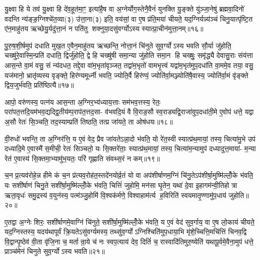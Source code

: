यु॒क्ष्वा हि ये तव॑ यु॒क्ष्वा हि दे॑व॒हूत॑मा॒ꣳ॒ इत्या॑है॒ष वा अ॒ग्नेर्योग॒स्तेनै॒वैनं॑ युनक्ति यु॒ङ्क्ते यु॑ञ्जा॒नेषु॑ ब्रह्मवा॒दिनो॑ वदन्ति न्य॑ङ्ङ॒ग्निश्चे॑त॒व्या(३) उ॑त्ता॒ना(३) इति॒ वय॑सां॒ वा ए॒ष प्र॑ति॒मया॑ चीयते॒ यद॒ग्निर्यन्न्य॑ञ्चं चिनु॒यात्पृ॑ष्टि॒त ए॑न॒माहु॑तय ऋच्छेयु॒र्यदु॑त्ता॒नं न पति॑तु शक्नुया॒दसु॑वर्ग्योऽस्य स्यात्प्रा॒चीन॑मुत्ता॒नम्॥१६॥

पु॒रु॒ष॒शी॒र्\mbox{}षमुप॑ दधाति मुख॒त ए॒वैन॒माहु॑तय ऋच्छन्ति॒ नोत्ता॒नं चि॑नुते सुव॒र्ग्योऽस्य भवति सौ॒र्या जु॑होति॒ चख्षु॑रे॒वास्मि॒न्प्रति॑ दधाति॒ द्विर्जु॑होति॒ द्वे हि चख्षु॑षी समा॒न्या जु॑होति समा॒न हि चख्षुः॒ समृ॑द्ध्यै देवासु॒राः संय॑त्ता आस॒न्ते वा॒मं वसु॒ सं न्य॑दधत॒ तद्दे॒वा वा॑म॒भृता॑वृञ्जत॒ तद्वा॑म॒भृतो॑ वामभृ॒त्त्वं यद्वा॑म॒भृत॑मुप॒दधा॑ति वा॒ममे॒व तया॒ वसु॒ यज॑मानो॒ भ्रातृ॑व्यस्य वृङ्क्ते॒ हिर॑ण्यमूर्ध्नी भवति॒ ज्योति॒र्वै हिर॑ण्यं॒ ज्योति॑र्वा॒मञ्ज्योति॑षै॒वास्य॒ ज्योति॑र्वा॒मं वृ॑ङ्क्ते द्विय॒जुर्भ॑वति॒ प्रति॑ष्ठित्यै॥१७॥

{\anuvakamend[{यु॒ञ्जा॒नेष्वग्ने प्रा॒चीन॑मुत्ता॒नं वा॑म॒भृत॒ञ्चतु॑र्विशतिश्च॥३॥}]}

आपो॒ वरु॑णस्य॒ पत्न॑य आस॒न्ता अ॒ग्निर॒भ्य॑ध्याय॒त्ताः सम॑भव॒त्तस्य॒ रेतः॒ परा॑पत॒त्तदि॒यम॑भव॒द्यद्द्वि॒तीय॑म्प॒राप॑त॒त्तद॒सा- व॑भवदि॒यं वै वि॒राड॒सौ स्व॒राड्यद्वि॒राजा॑वुप॒दधा॑ती॒मे ए॒वोप॑ धत्ते॒ यद्वा अ॒सौ रेतः॑ सि॒ञ्चति॒ तद॒स्याम्प्रति॑ तिष्ठति॒ तत्प्र जा॑यते॒ ता ओष॑धयः॥१८॥

वी॒रुधो॑ भवन्ति॒ ता अ॒ग्निर॑त्ति॒ य ए॒वं वेद॒ प्रैव जा॑यतेऽन्ना॒दो भ॑वति॒ यो रे॑त॒स्वी स्यात्प्र॑थ॒मायां॒ तस्य॒ चित्या॑मु॒भे उप॑ दध्यादि॒मे ए॒वास्मै॑ स॒मीची॒ रेतः॑ सिञ्चतो॒ यः सि॒क्तरे॑ताः॒ स्यात्प्र॑थ॒मायां॒ तस्य॒ चित्या॑म॒न्यामुप॑ दध्यादुत्त॒माया॑- म॒न्या रेत॑ ए॒वास्य॑ सि॒क्तमा॒भ्यामु॑भ॒यतः॒ परि॑ गृह्णाति संवथ्स॒रं न कम्॥१९॥

च॒न प्र॒त्यव॑रोहे॒न्न हीमे कं च॒न प्र॑त्यव॒रोह॑त॒स्तदे॑नयोर्व्र॒तं यो वा अप॑शीर्\mbox{}षाणम॒ग्निं चि॑नु॒तेऽप॑शीर्\mbox{}षा॒मुष्मि॑ल्लोँ॒के भ॑वति॒ यः सशी॑र्\mbox{}षाणं चिनु॒ते सशी॑र्\mbox{}षा॒मुष्मि॑ल्लोँ॒के भ॑वति॒ चित्तिं॑ जुहोमि॒ मन॑सा घृ॒तेन॒ यथा॑ दे॒वा इ॒हागम॑न्वी॒तिहोत्रा ऋता॒वृधः॑ समु॒द्रस्य॑ व॒युन॑स्य॒ पत्म॑ञ्जु॒होमि॑ वि॒श्वक॑र्मणे॒ विश्वाहाम॑र्त्य ह॒विरिति॑ स्वयमातृ॒ण्णामु॑प॒धाय॑ जुहोति॥२०॥

ए॒तद्वा अ॒ग्नेः शिरः॒ सशी॑र्\mbox{}षाणमे॒वाग्निं चि॑नुते॒ सशी॑र्\mbox{}षा॒मुष्मि॑ल्लोँ॒के भ॑वति॒ य ए॒वं वेद॑ सुव॒र्गाय॒ वा ए॒ष लो॒काय॑ चीयते॒ यद॒ग्निस्तस्य॒ यदय॑थापूर्वं क्रि॒यतेऽसु॑वर्ग्यमस्य॒ तथ्सु॑व॒र्ग्योऽग्निश्चिति॑मुप॒धाया॒भि मृ॑शे॒च्चित्ति॒मचि॑त्तिं चिनव॒द्वि वि॒द्वान्पृ॒ष्ठेव॑ वी॒ता वृ॑जि॒ना च॒ मर्तान्रा॒ये च॑ नः स्वप॒त्याय॑ देव॒ दितिं॑ च॒ रास्वादि॑तिमुरु॒ष्येति॑ यथापू॒र्वमे॒वैना॒मुप॑ धत्ते॒ प्राञ्च॑मेनं चिनुते सुव॒र्ग्योऽस्य भवति॥२१॥

